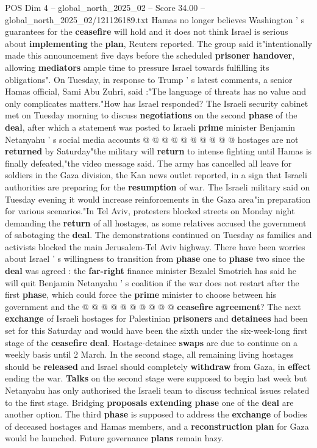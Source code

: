 \begin{textsample}{POS Dim 4 – global\_north\_2025\_02 – Score 34.00 – global\_north\_2025\_02/121126189.txt}
Hamas no longer believes Washington ' s guarantees for the \textbf{ceasefire} will hold and it does not think Israel is serious about \textbf{implementing} the \textbf{plan}, Reuters reported.
The group said it"intentionally made this announcement five days before the scheduled \textbf{prisoner} \textbf{handover}, allowing \textbf{mediators} ample time to pressure Israel towards fulfilling its obligations".
On Tuesday, in response to Trump ' s latest comments, a senior Hamas official, Sami Abu Zuhri, said :"The language of threats has no value and only complicates matters."How has Israel responded?
The Israeli security cabinet met on Tuesday morning to discuss \textbf{negotiations} on the second \textbf{phase} of the \textbf{deal}, after which a statement was posted to Israeli \textbf{prime} minister Benjamin Netanyahu ' s social media accounts @ @ @ @ @ @ @ @ @ @ hostages are not \textbf{returned} by Saturday"the military will \textbf{return} to intense fighting until Hamas is finally defeated,"the video message said.
The army has cancelled all leave for soldiers in the Gaza division, the Kan news outlet reported, in a sign that Israeli authorities are preparing for the \textbf{resumption} of war.
The Israeli military said on Tuesday evening it would increase reinforcements in the Gaza area"in preparation for various scenarios."In Tel Aviv, protesters blocked streets on Monday night demanding the \textbf{return} of all hostages, as some relatives accused the government of sabotaging the \textbf{deal}.
The demonstrations continued on Tuesday as families and activists blocked the main Jerusalem-Tel Aviv highway.
There have been worries about Israel ' s willingness to transition from \textbf{phase} one to \textbf{phase} two since the \textbf{deal} was agreed : the \textbf{far-right} finance minister Bezalel Smotrich has said he will quit Benjamin Netanyahu ' s coalition if the war does not restart after the first \textbf{phase}, which could force the \textbf{prime} minister to choose between his government and the @ @ @ @ @ @ @ @ @ @ \textbf{ceasefire} \textbf{agreement}?
The next \textbf{exchange} of Israeli hostages for Palestinian \textbf{prisoners} and \textbf{detainees} had been set for this Saturday and would have been the sixth under the six-week-long first stage of the \textbf{ceasefire} \textbf{deal}.
Hostage-detainee \textbf{swaps} are due to continue on a weekly basis until 2 March.
In the second stage, all remaining living hostages should be \textbf{released} and Israel should completely \textbf{withdraw} from Gaza, in \textbf{effect} ending the war. \textbf{Talks} on the second stage were supposed to begin last week but Netanyahu has only authorised the Israeli team to discuss technical issues related to the first stage.
Bridging \textbf{proposals} \textbf{extending} \textbf{phase} one of the \textbf{deal} are another option.
The third \textbf{phase} is supposed to address the \textbf{exchange} of bodies of deceased hostages and Hamas members, and a \textbf{reconstruction} \textbf{plan} for Gaza would be launched.
Future governance \textbf{plans} remain hazy.


\end{textsample}

